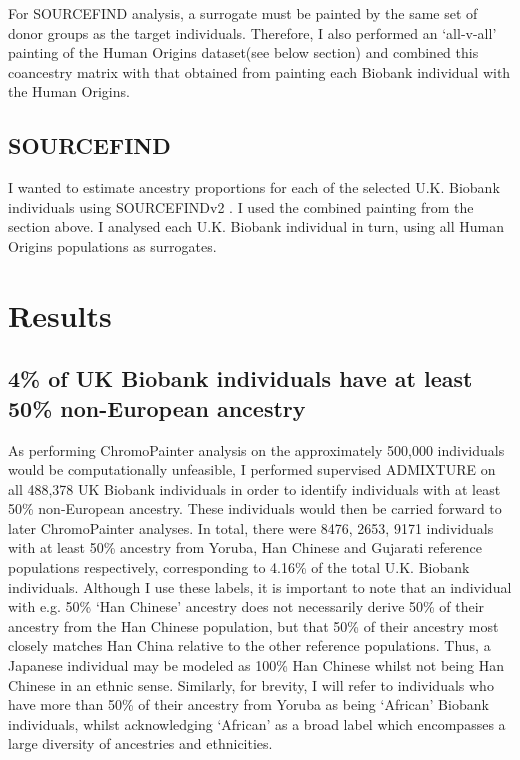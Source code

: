 For SOURCEFIND analysis, a surrogate must be painted by the same set of donor groups as the target individuals. Therefore, I also performed an `all-v-all' painting of the Human Origins dataset(see below section) and combined this coancestry matrix with that obtained from painting each Biobank individual with the Human Origins.

\subsection{SOURCEFIND}

I wanted to estimate ancestry proportions for each of the selected U.K. Biobank individuals using SOURCEFINDv2 \cite{Chacon-Duque2018}. I used the combined painting from the section above. I analysed each U.K. Biobank individual in turn, using all Human Origins populations as surrogates.

\section{Results}

\subsection{4\% of UK Biobank individuals have at least 50\% non-European ancestry}

As performing ChromoPainter analysis on the approximately 500,000 individuals would be computationally unfeasible, I performed supervised ADMIXTURE on all 488,378 UK Biobank individuals in order to identify individuals with at least 50\% non-European ancestry. These individuals would then be carried forward to later ChromoPainter analyses. In total, there were 8476, 2653, 9171 individuals with at least 50\% ancestry from Yoruba, Han Chinese and Gujarati reference populations respectively, corresponding to 4.16\% of the total U.K. Biobank individuals. Although I use these labels, it is important to note that an individual with e.g. 50\% `Han Chinese' ancestry does not necessarily derive 50\% of their ancestry from the Han Chinese population, but that 50\% of their ancestry most closely matches Han China relative to the other reference populations. Thus, a Japanese individual may be modeled as 100\% Han Chinese whilst not being Han Chinese in an ethnic sense. Similarly, for brevity, I will refer to individuals who have more than 50\% of their ancestry from Yoruba as being `African' Biobank individuals, whilst acknowledging `African' as a broad label which encompasses a large diversity of ancestries and ethnicities.  

